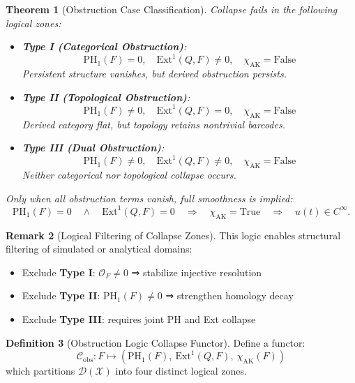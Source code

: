 \documentclass[11pt]{article}
\newtheorem{theorem}{Theorem}[section]
\theoremstyle{definition}
\newtheorem{definition}[theorem]{Definition}
\newtheorem{remark}[theorem]{Remark}
\begin{document}
\begin{theorem}[Obstruction Case Classification]
Collapse fails in the following logical zones:
\begin{itemize}
  \item \textbf{Type I (Categorical Obstruction)}:  
    \[
    \mathrm{PH}_1(F) = 0,\quad \mathrm{Ext}^1(Q,F) \ne 0,\quad \chi_{\text{AK}} = \text{False}
    \]
    Persistent structure vanishes, but derived obstruction persists.

  \item \textbf{Type II (Topological Obstruction)}:  
    \[
    \mathrm{PH}_1(F) \ne 0,\quad \mathrm{Ext}^1(Q,F) = 0,\quad \chi_{\text{AK}} = \text{False}
    \]
    Derived category flat, but topology retains nontrivial barcodes.

  \item \textbf{Type III (Dual Obstruction)}:  
    \[
    \mathrm{PH}_1(F) \ne 0,\quad \mathrm{Ext}^1(Q,F) \ne 0,\quad \chi_{\text{AK}} = \text{False}
    \]
    Neither categorical nor topological collapse occurs.
\end{itemize}
Only when all obstruction terms vanish, full smoothness is implied:
\[
\mathrm{PH}_1(F) = 0 \quad \wedge \quad \mathrm{Ext}^1(Q,F) = 0
\quad \Rightarrow \quad \chi_{\text{AK}} = \text{True} \quad \Rightarrow \quad u(t) \in C^\infty.
\]
\end{theorem}

\begin{remark}[Logical Filtering of Collapse Zones]
This logic enables structural filtering of simulated or analytical domains:
\begin{itemize}
  \item Exclude \textbf{Type I}: $\mathcal{O}_F \ne 0$ ⇒ stabilize injective resolution
  \item Exclude \textbf{Type II}: $\mathrm{PH}_1(F) \ne 0$ ⇒ strengthen homology decay
  \item Exclude \textbf{Type III}: requires joint PH and Ext collapse
\end{itemize}
\end{remark}

\begin{definition}[Obstruction Logic Collapse Functor]
Define a functor:
\[
\mathcal{C}_{\text{obs}} : F \mapsto \left( \mathrm{PH}_1(F),\ \mathrm{Ext}^1(Q,F),\ \chi_{\text{AK}}(F) \right)
\]
which partitions $\mathcal{D}(\mathcal{X})$ into four distinct logical zones.
\end{definition}
\end{document}
